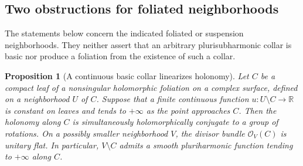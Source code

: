 \documentclass[11pt]{amsart}
\newtheorem{proposition}[theorem]{Proposition}
\theoremstyle{definition}
\theoremstyle{remark}
\numberwithin{equation}{section}
\newcommand{\R}{\mathbb R}
\newcommand{\OO}{\mathcal O}
\begin{document}
\subsection{Two obstructions for foliated neighborhoods}

The statements below concern the indicated foliated or suspension neighborhoods.
They neither assert that an arbitrary plurisubharmonic collar is basic nor
produce a foliation from the existence of such a collar.

\begin{proposition}[A continuous basic collar linearizes holonomy]
\label{prop:basic-collar}
Let $C$ be a compact leaf of a nonsingular holomorphic foliation on a complex
surface, defined on a neighborhood $U$ of $C$. Suppose that a finite continuous
function $u:U\setminus C\to\R$ is constant on leaves and tends to
$+\infty$ as the point approaches $C$. Then the holonomy along $C$ is
simultaneously holomorphically conjugate to a group of rotations.
On a possibly smaller neighborhood $V$, the divisor bundle $\OO_V(C)$ is
unitary flat. In particular, $V\setminus C$ admits a smooth pluriharmonic
function tending to $+\infty$ along $C$.
\end{proposition}
\end{document}
